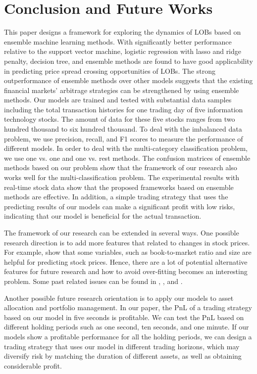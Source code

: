 \chapter{Conclusion and Future Works}\label{ch:conclusion}
This paper designs a framework for exploring the dynamics of LOBs based on ensemble machine learning methods. With significantly better performance relative to the support vector machine, logistic regression with lasso and ridge penalty, decision tree, and ensemble methods are found to  have good applicability in predicting price spread crossing opportunities of LOBs. The strong outperformance of ensemble methods over other models suggests that the existing financial markets' arbitrage strategies can be strengthened by using ensemble methods. Our models are trained and tested with substantial data samples including the total transaction histories for one trading day of five information technology stocks. The amount of data for these five stocks ranges from two hundred thousand to six hundred thousand. To deal with the imbalanced data problem, we use precision, recall, and F1 scores to measure the performance of different models. In order to deal with the multi-category classification problem, we use one vs. one and one vs. rest methods. The confusion matrices of ensemble methods based on our problem show that the framework of our research also works well for the multi-classification problem.
The experimental results with real-time stock data show that the proposed frameworks based on ensemble methods are effective. 
In addition, a simple trading strategy that uses the predicting results of our models can make a significant profit with low risks, indicating that our model is beneficial for the actual transaction. 

The framework of our research can be extended in several ways. One possible research direction is to add more features that related to changes in stock prices. For example, \cite{wahal2013style} show that some variables, such as book-to-market ratio and size are helpful for predicting stock prices. Hence, there are a lot of potential alternative features for future research and how to avoid over-fitting becomes an interesting problem. Some past related issues can be found in \cite{fan2008sure}, \cite{fan2010sure}, and \cite{buhlmann2013correlated}.

Another possible future research orientation is to apply our models to asset allocation and  portfolio management. In our paper, the PnL of a trading strategy based on our model in five seconds is profitable. We can test the PnL based on different holding periods such as one second, ten seconds, and one minute. If our models show a profitable performance for all the holding periods, we can design a trading strategy that uses our model in different trading horizons, which may diversify risk by matching the duration of different assets, as well as obtaining considerable profit.  

